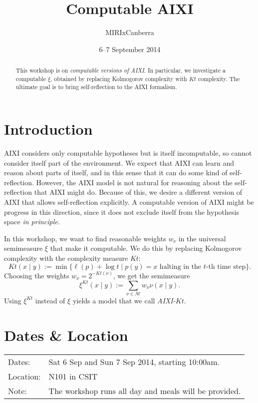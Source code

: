 \documentclass[a4paper]{article}
\begin{document}
\title{Computable AIXI}
\author{\textsf{MIRIxCanberra}}
\date{6--7 September 2014}

\maketitle

\begin{abstract}
This workshop is on \emph{computable versions of AIXI}.
In particular, we investigate a computable $\xi$,
obtained by replacing Kolmogorov complexity with $Kt$ complexity.
The ultimate goal is to bring self-reflection to the AIXI formalism.
\end{abstract}


\section{Introduction}

AIXI considers only computable hypotheses
but is itself incomputable,
so cannot consider itself part of the environment.
We expect that AIXI can learn and reason about parts of itself,
and in this sense that it can do some kind of self-reflection.
However, the AIXI model is not natural for reasoning about
the self-reflection that AIXI might do.
Because of this, we desire a different version of AIXI that
allows self-reflection explicitly.
A computable version of AIXI might be progress in this direction,
since it does not exclude itself from the hypothesis space \emph{in principle}.

In this workshop,
we want to find reasonable weights $w_\nu$
in the universal semimeasure $\xi$ that make it computable.
We do this by replacing Kolmogorov complexity with
the complexity measure $Kt$:
\[
   Kt(x \mid y)
:= \min \{ \ell(p) + \log t \mid p(y) = x \text{ halting in the $t$-th time step} \}.
\]
Choosing the weights $w_\nu = 2^{-Kt(\nu)}$,
we get the semimeasure
\[
\xi^{Kt}(x \mid y) := \sum_{\nu \in \mathcal{M}} w_\nu \nu(x \mid y).
\]
Using $\xi^{Kt}$ instead of $\xi$ yields a model that we call \emph{AIXI-$Kt$}.


\section{Dates \& Location}

\begin{tabular}{ll}
Dates: & Sat 6 Sep and Sun 7 Sep 2014, starting 10:00{\sc am}.\\
Location: & N101 in CSIT \\
Note: & The workshop runs all day and meals will be provided.
\end{tabular}
\end{document}
